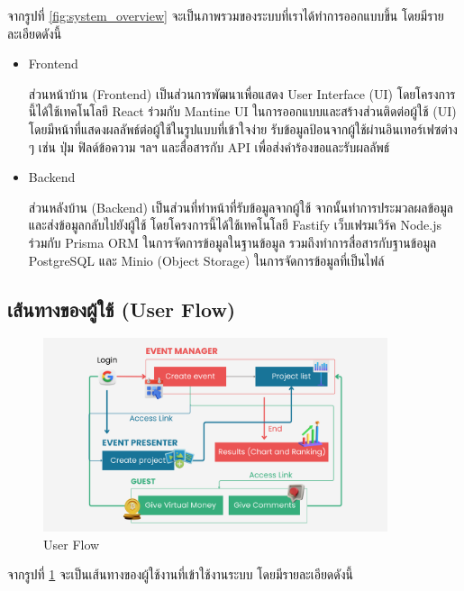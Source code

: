 จากรูปที่ \ref{fig:system_overview} จะเป็นภาพรวมของระบบที่เราได้ทำการออกแบบขึ้น โดยมีรายละเอียดดังนี้
\begin{itemize}
    \item Frontend

          ส่วนหน้าบ้าน (Frontend) เป็นส่วนการพัฒนาเพื่อแสดง User Interface (UI) โดยโครงการนี้ได้ใช้เทคโนโลยี React ร่วมกับ Mantine UI ในการออกแบบและสร้างส่วนติดต่อผู้ใช้ (UI) โดยมีหน้าที่แสดงผลลัพธ์ต่อผู้ใช้ในรูปแบบที่เข้าใจง่าย รับข้อมูลป้อนจากผู้ใช้ผ่านอินเทอร์เฟซต่าง ๆ เช่น ปุ่ม ฟิลด์ข้อความ ฯลฯ และสื่อสารกับ API เพื่อส่งคำร้องขอและรับผลลัพธ์
    \item Backend

          ส่วนหลังบ้าน (Backend) เป็นส่วนที่ทำหน้าที่รับข้อมูลจากผู้ใช้ จากนั้นทำการประมวลผลข้อมูล และส่งข้อมูลกลับไปยังผู้ใช้ โดยโครงการนี้ได้ใช้เทคโนโลยี Fastify เว็บเฟรมเวิร์ค Node.js ร่วมกับ Prisma ORM ในการจัดการข้อมูลในฐานข้อมูล รวมถึงทำการสื่อสารกับฐานข้อมูล PostgreSQL และ Minio (Object Storage) ในการจัดการข้อมูลที่เป็นไฟล์
\end{itemize}

\subsection{เส้นทางของผู้ใช้ (User Flow)}
\begin{figure}[h]
    \begin{center}
        \includegraphics[width=0.9\textwidth]{img/userflow.png}
    \end{center}
    \caption[Poem]{User Flow}
    \label{fig:user_flow}
\end{figure}

จากรูปที่ \ref{fig:user_flow} จะเป็นเส้นทางของผู้ใช้งานที่เข้าใช้งานระบบ โดยมีรายละเอียดดังนี้

